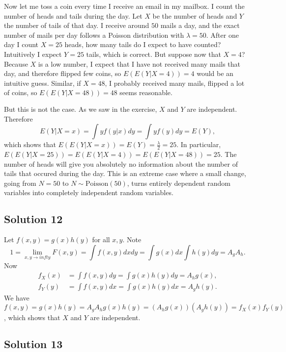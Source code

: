 Now let me toss a coin every time I receive an email in my mailbox.
I count the number of heads and tails during the day.
Let $X$ be the number of heads and $Y$ the number of tails of that day.
I receive around $50$ mails a day, and the exact number of mails per day follows a Poisson distribution with $\lambda = 50$.
After one day I count $X = 25$ heads, how many tails do I expect to have counted?
Intuitively I expect $Y = 25$ tails, which is correct.
But suppose now that $X = 4$?
Because $X$ is a low number, I expect that I have not received many mails that day, and therefore flipped few coins, so $E(E(Y | X = 4)) = 4$ would be an intuitive guess.
Similar, if $X = 48$, I probably received many mails, flipped a lot of coins, so $E(E(Y | X = 48)) = 48$ seems reasonable.

But this is not the case.
As we saw in the exercise, $X$ and $Y$ are independent.
Therefore
$$
E(Y | X = x) = \int y f(y|x) dy = \int y f(y) dy = E(Y),
$$
which shows that $E(E(Y | X = x)) = E(Y) = \frac{\lambda}{2} = 25$.
In particular, $E(E(Y | X = 25)) = E(E(Y | X = 4)) = E(E(Y | X = 48)) = 25$.
The number of heads will give you absolutely no information about the number of tails that occured during the day.
This is an extreme case where a small change, going from $N = 50$ to $N \sim \mathrm{Poisson}(50)$, turns entirely dependent random variables into completely independent random variables.


\subsection*{Solution 12}

Let $f(x, y) = g(x) h(y)$ for all $x, y$.
Note
$$
1 = \lim_{x, y \to infty} F(x, y) = \int f(x, y) dx dy = \int g(x) dx \int h(y) dy = A_g A_h.
$$
Now
\begin{equation*}
    \begin{split}
        f_X(x) &= \int f(x, y) dy = \int g(x) h(y) dy = A_h g(x), \\
        f_Y(y) &= \int f(x, y) dx = \int g(x) h(y) dx = A_g h(y).
    \end{split}
\end{equation*}
We have $f(x, y) = g(x) h(y) = A_g A_h g(x) h(y) = (A_h g(x))(A_g h(y)) = f_X(x) f_Y(y)$, which shows that $X$ and $Y$ are independent.


\subsection*{Solution 13}

